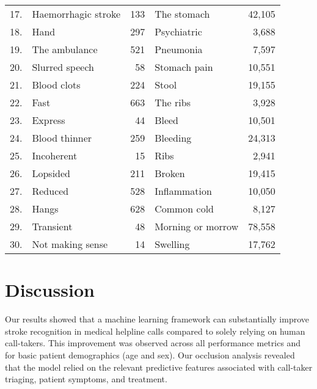 {\begin{table}[t]
{\begin{tabular}{l|lr|lr}
        17. & Haemorrhagic stroke & 133 & The stomach & 42,105 \\        
        18. & Hand & 297 & Psychiatric & 3,688 \\        
        19. & The ambulance & 521 & Pneumonia & 7,597 \\        
        20. & Slurred speech & 58 & Stomach pain & 10,551 \\        
        21. & Blood clots & 224 & Stool & 19,155 \\        
        22. & Fast & 663 & The ribs & 3,928 \\        
        23. & Express & 44 & Bleed & 10,501 \\        
        24. & Blood thinner & 259 & Bleeding & 24,313 \\        
        25. & Incoherent & 15 & Ribs & 2,941 \\        
        26. & Lopsided & 211 & Broken & 19,415 \\        
        27. & Reduced & 528 & Inflammation & 10,050 \\        
        28. & Hangs & 628 & Common cold & 8,127 \\        
        29. & Transient & 48 & Morning or morrow & 78,558 \\        
        30. & Not making sense & 14 & Swelling & 17,762 \\        
        \bottomrule
    \end{tabular}%
    }
\end{table}


\section{Discussion}

Our results showed that a machine learning framework can substantially improve stroke recognition in medical helpline calls compared to solely relying on human call-takers. This improvement was observed across all performance metrics and for basic patient demographics (age and sex). Our occlusion analysis revealed that the model relied on the relevant predictive features associated with call-taker triaging, patient symptoms, and treatment.

}
